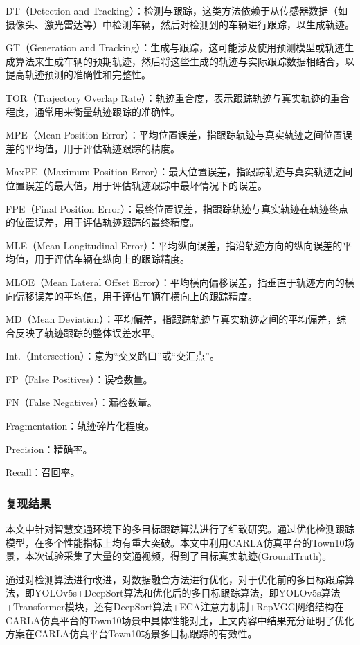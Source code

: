 DT（Detection and Tracking）：检测与跟踪，这类方法依赖于从传感器数据（如摄像头、激光雷达等）中检测车辆，然后对检测到的车辆进行跟踪，以生成轨迹。

GT（Generation and Tracking）：生成与跟踪，这可能涉及使用预测模型或轨迹生成算法来生成车辆的预期轨迹，然后将这些生成的轨迹与实际跟踪数据相结合，以提高轨迹预测的准确性和完整性。

TOR（Trajectory Overlap Rate）：轨迹重合度，表示跟踪轨迹与真实轨迹的重合程度，通常用来衡量轨迹跟踪的准确性。

MPE（Mean Position Error）：平均位置误差，指跟踪轨迹与真实轨迹之间位置误差的平均值，用于评估轨迹跟踪的精度。

MaxPE（Maximum Position Error）：最大位置误差，指跟踪轨迹与真实轨迹之间位置误差的最大值，用于评估轨迹跟踪中最坏情况下的误差。

FPE（Final Position Error）：最终位置误差，指跟踪轨迹与真实轨迹在轨迹终点的位置误差，用于评估轨迹跟踪的最终精度。

MLE（Mean Longitudinal Error）：平均纵向误差，指沿轨迹方向的纵向误差的平均值，用于评估车辆在纵向上的跟踪精度。

MLOE（Mean Lateral Offset Error）：平均横向偏移误差，指垂直于轨迹方向的横向偏移误差的平均值，用于评估车辆在横向上的跟踪精度。

MD（Mean Deviation）：平均偏差，指跟踪轨迹与真实轨迹之间的平均偏差，综合反映了轨迹跟踪的整体误差水平。

Int.（Intersection）：意为“交叉路口”或“交汇点”。


FP（False Positives）：误检数量。

FN（False Negatives）：漏检数量。

Fragmentation：轨迹碎片化程度。

Precision：精确率。

Recall：召回率。

\subsubsection{复现结果}

本文中针对智慧交通环境下的多目标跟踪算法进行了细致研究。通过优化检测跟踪模型，在多个性能指标上均有重大突破。本文中利用CARLA仿真平台的Town10场景，本次试验采集了大量的交通视频，得到了目标真实轨迹(GroundTruth)。

通过对检测算法进行改进，对数据融合方法进行优化，对于优化前的多目标跟踪算法，即YOLOv5s+DeepSort算法和优化后的多目标跟踪算法，即YOLOv5s算法+Transformer模块，还有DeepSort算法+ECA注意力机制+RepVGG网络结构在CARLA仿真平台的Town10场景中具体性能对比，上文内容中结果充分证明了优化方案在CARLA仿真平台Town10场景多目标跟踪的有效性。


